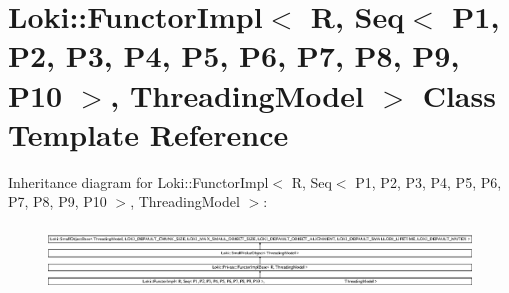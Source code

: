 \hypertarget{classLoki_1_1FunctorImpl_3_01R_00_01Seq_3_01P1_00_01P2_00_01P3_00_01P4_00_01P5_00_01P6_00_01P7_0bc721448b5d6c373b3afd9cd894a0381}{}\section{Loki\+:\+:Functor\+Impl$<$ R, Seq$<$ P1, P2, P3, P4, P5, P6, P7, P8, P9, P10 $>$, Threading\+Model $>$ Class Template Reference}
\label{classLoki_1_1FunctorImpl_3_01R_00_01Seq_3_01P1_00_01P2_00_01P3_00_01P4_00_01P5_00_01P6_00_01P7_0bc721448b5d6c373b3afd9cd894a0381}
Inheritance diagram for Loki\+:\+:Functor\+Impl$<$ R, Seq$<$ P1, P2, P3, P4, P5, P6, P7, P8, P9, P10 $>$, Threading\+Model $>$\+:\begin{figure}[H]
\begin{center}
\leavevmode
\includegraphics[height=1.751368cm]{classLoki_1_1FunctorImpl_3_01R_00_01Seq_3_01P1_00_01P2_00_01P3_00_01P4_00_01P5_00_01P6_00_01P7_0bc721448b5d6c373b3afd9cd894a0381}
\end{center}
\end{figure}
